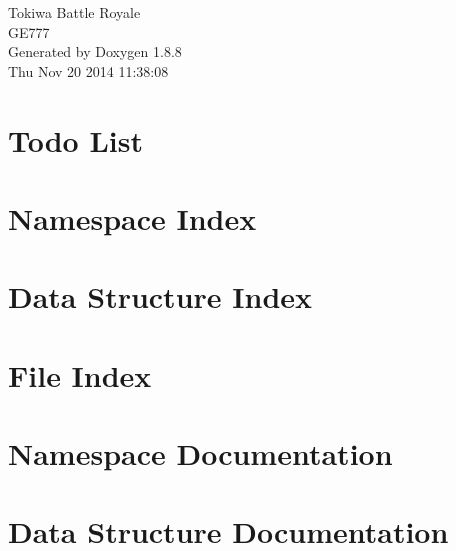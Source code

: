 \documentclass[twoside]{book}
\newcommand{\+}{\discretionary{\mbox{\scriptsize$\hookleftarrow$}}{}{}}
\newcommand{\clearemptydoublepage}{%
  \newpage{\pagestyle{empty}\cleardoublepage}%
}
\begin{document}
\hypersetup{pageanchor=false,
             bookmarks=true,
             bookmarksnumbered=true,
             pdfencoding=unicode
            }
\begin{titlepage}
\vspace*{7cm}
\begin{center}%
{\Large Tokiwa Battle Royale \\[1ex]\large G\+E777 }\\
\vspace*{1cm}
{\large Generated by Doxygen 1.8.8}\\
\vspace*{0.5cm}
{\small Thu Nov 20 2014 11:38:08}\\
\end{center}
\end{titlepage}
\clearemptydoublepage
\tableofcontents
\clearemptydoublepage
{}
\hypersetup{pageanchor=true}

\chapter{Todo List}
\label{todo}
\hypertarget{todo}{}

\chapter{Namespace Index}

\chapter{Data Structure Index}

\chapter{File Index}

\chapter{Namespace Documentation}

\chapter{Data Structure Documentation}


\end{document}

